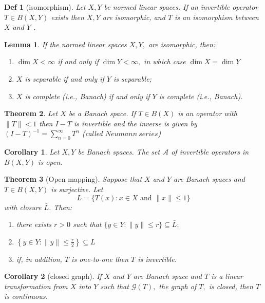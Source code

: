 \documentclass[10pt]{paper}
\newtheorem{theorem}{Theorem}[section]
\newtheorem{definition}{Def}[section]
\newtheorem{corollary}{Corollary}[section]
\newtheorem{lemma}[theorem]{Lemma}
\begin{document}
\begin{definition}[isomorphism]
    Let $X, Y$ be normed linear spaces. If an invertible operator $T \in B(X, Y)$ exists then $X, Y$ are isomorphic, and $T$ is an isomorphism between $X$ and $Y$ .
\end{definition}

\begin{lemma}
    If the normed linear spaces $X, Y,$ are isomorphic, then:
    \begin{enumerate}
        \item  $\operatorname{dim} X<\infty$ if and only if $\operatorname{dim} Y<\infty,$ in which case $\operatorname{dim} X=\operatorname{dim} Y$
        \item $X$ is separable if and only if $Y$ is separable;
        \item $X$ is complete (i.e., Banach) if and only if $Y$ is complete (i.e., Banach).
    \end{enumerate}
\end{lemma}

\begin{theorem}
    Let $X$ be a Banach space. If $T \in B(X)$ is an operator with $\|T\|<1$ then $I-T$ is invertible and the inverse is given by $(I-T)^{-1}=\sum_{n=0}^{\infty} T^{n}$ (called $Neumann \ series$)
\end{theorem}

\begin{corollary}
    Let $X, Y$ be Banach spaces. The set $\mathcal{A}$ of invertible operators in $B(X, Y)$ is open.
\end{corollary}

\begin{theorem}[Open mapping]
    Suppose that $X$ and $Y$ are Banach spaces and $T \in B(X, Y)$ is surjective. Let
    $$
        L=\{T(x): x \in X \text { and }\|x\| \leq 1\}
    $$
    with closure $\bar{L}$. Then:
    \begin{enumerate}
        \item there exists $r>0$ such that $\{y \in Y:\|y\| \leq r\} \subseteq \bar{L} ;$
        \item $\left\{y \in Y:\|y\| \leq \frac{r}{2}\right\} \subseteq L$
        \item if, in addition, $T$ is one-to-one then $T$ is invertible.
    \end{enumerate}
\end{theorem}

\begin{corollary}[closed graph]
    If $X$ and $Y$ are Banach space and $T$ is a linear transformation from $X$ into $Y$ such that $\mathcal{G}(T),$ the graph of $T,$ is closed, then $T$ is continuous.
\end{corollary}
\end{document}
